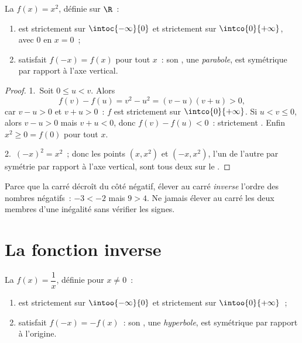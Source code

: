 \begin{proposition}\label{prop:g10:reffunc:square}
La  $f(x) = x^2$, définie sur $\R$~:
\begin{enumerate}
  \item est strictement  sur $\intoc{-\infty}{0}$ et
        strictement  sur $\intco{0}{+\infty}$, avec  $0$
        en $x = 0$~;
  \item satisfait $f(-x) = f(x)$ pour tout $x$~: son , une
        \emph{parabole}, est symétrique par rapport à
        l'axe vertical.
\end{enumerate}
\end{proposition}

\begin{proof}
1.~Soit $0 \leq u < v$. Alors
\[
f(v) - f(u) = v^2 - u^2 = (v - u)(v + u) > 0,
\]
car $v - u > 0$ et $v + u > 0$~: $f$ est strictement  sur
$\intco{0}{+\infty}$. Si $u < v \leq 0$, alors $v - u > 0$ mais
$v + u < 0$, donc $f(v) - f(u) < 0$~: strictement . Enfin
$x^2 \geq 0 = f(0)$ pour tout $x$.

2.~$(-x)^2 = x^2$~; donc les points $(x, x^2)$ et $(-x, x^2)$, 
l'un de l'autre par symétrie par rapport à l'axe vertical, sont tous
deux sur le .
\end{proof}

\begin{remark}
Parce que la  carré décroît du côté négatif, élever au carré
\emph{inverse} l'ordre des nombres négatifs~: $-3 < -2$ mais $9 > 4$.
Ne jamais élever au carré les deux membres d'une inégalité sans vérifier
les signes.
\end{remark}

\section{La fonction inverse}

\begin{proposition}\label{prop:g10:reffunc:inverse}
La  $f(x) = \dfrac1x$, définie pour $x \neq 0$~:
\begin{enumerate}
  \item est strictement  sur $\intoo{-\infty}{0}$ et
        strictement  sur $\intoo{0}{+\infty}$~;
  \item satisfait $f(-x) = -f(x)$~: son , une
        \emph{hyperbole}, est symétrique par rapport à
        l'origine.
\end{enumerate}
\end{proposition}

